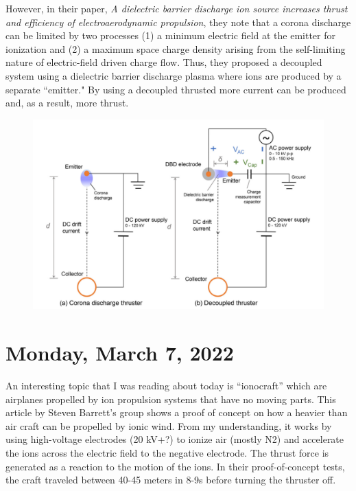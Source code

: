 \documentclass[12pt]{article}
\begin{document}
\par
However, in their paper, \textit{A dielectric barrier discharge ion source increases thrust and efficiency of electroaerodynamic propulsion}, they note that a corona discharge can be limited by two processes (1) a minimum electric field at the emitter for ionization and (2) a maximum space charge density arising from the self-limiting nature of electric-field driven charge flow. Thus, they proposed a decoupled system using a dielectric barrier discharge plasma where ions are produced by a separate ``emitter." By using a decoupled thrusted more current can be produced and, as a result, more thrust. 

\begin{figure}[H]
\centering
\includegraphics[width=\linewidth]{images/dbd thruster schematic.pdf}
\end{figure}

\section{Monday, March 7, 2022}
\par
An interesting topic that I was reading about today is “ionocraft” which are airplanes propelled by ion propulsion systems that have no moving parts. This article by Steven Barrett’s group shows a proof of concept on how a heavier than air craft can be propelled by ionic wind. From my understanding, it works by using high-voltage electrodes (20 kV+?) to ionize air (mostly N2) and accelerate the ions across the electric field to the negative electrode.  The thrust force is generated as a reaction to the motion of the ions. In their proof-of-concept tests, the craft traveled between 40-45 meters in 8-9s before turning the thruster off.
\end{document}
